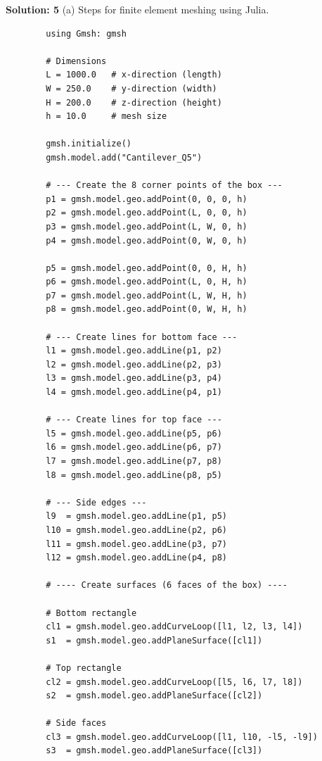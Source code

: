 \documentclass{homework}
\begin{document}
\begin{solution}
    \textbf{Solution: 5}
    (a) Steps for finite element meshing using Julia. 
    \sloppy
    \begin{verbatim}
        using Gmsh: gmsh
        
        # Dimensions
        L = 1000.0   # x-direction (length)
        W = 250.0    # y-direction (width)
        H = 200.0    # z-direction (height)
        h = 10.0     # mesh size
        
        gmsh.initialize()
        gmsh.model.add("Cantilever_Q5")
        
        # --- Create the 8 corner points of the box ---
        p1 = gmsh.model.geo.addPoint(0, 0, 0, h)
        p2 = gmsh.model.geo.addPoint(L, 0, 0, h)
        p3 = gmsh.model.geo.addPoint(L, W, 0, h)
        p4 = gmsh.model.geo.addPoint(0, W, 0, h)
        
        p5 = gmsh.model.geo.addPoint(0, 0, H, h)
        p6 = gmsh.model.geo.addPoint(L, 0, H, h)
        p7 = gmsh.model.geo.addPoint(L, W, H, h)
        p8 = gmsh.model.geo.addPoint(0, W, H, h)
        
        # --- Create lines for bottom face ---
        l1 = gmsh.model.geo.addLine(p1, p2)
        l2 = gmsh.model.geo.addLine(p2, p3)
        l3 = gmsh.model.geo.addLine(p3, p4)
        l4 = gmsh.model.geo.addLine(p4, p1)
        
        # --- Create lines for top face ---
        l5 = gmsh.model.geo.addLine(p5, p6)
        l6 = gmsh.model.geo.addLine(p6, p7)
        l7 = gmsh.model.geo.addLine(p7, p8)
        l8 = gmsh.model.geo.addLine(p8, p5)
        
        # --- Side edges ---
        l9  = gmsh.model.geo.addLine(p1, p5)
        l10 = gmsh.model.geo.addLine(p2, p6)
        l11 = gmsh.model.geo.addLine(p3, p7)
        l12 = gmsh.model.geo.addLine(p4, p8)
        
        # ---- Create surfaces (6 faces of the box) ----
        
        # Bottom rectangle
        cl1 = gmsh.model.geo.addCurveLoop([l1, l2, l3, l4])
        s1  = gmsh.model.geo.addPlaneSurface([cl1])
        
        # Top rectangle
        cl2 = gmsh.model.geo.addCurveLoop([l5, l6, l7, l8])
        s2  = gmsh.model.geo.addPlaneSurface([cl2])
        
        # Side faces
        cl3 = gmsh.model.geo.addCurveLoop([l1, l10, -l5, -l9])
        s3  = gmsh.model.geo.addPlaneSurface([cl3])
        

\end{verbatim}
\end{solution}
\end{document}
